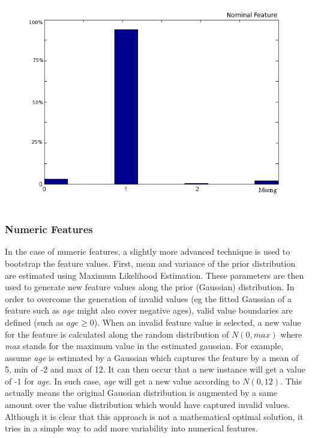 \includegraphics[scale=0.65]{img/nominalEst.png}



\newpage
\subsubsection{Numeric Features}
In the case of numeric features, a slightly more advanced technique is used to bootstrap the feature values. First, mean and variance of the prior distribution are estimated using Maximum Likelihood Estimation. These parameters are then used to generate new feature values along the prior (Gaussian) distribution. In order to overcome the generation of invalid values (eg the fitted Gaussian of a feature such as \textit{age} might also cover negative ages), valid value boundaries are defined (such as \(age \geq 0\)). When an invalid feature value is selected, a new value for the feature is calculated along the random distribution of \(N(0,max)\) where \textit{max} stands for the maximum value in the estimated gaussian. For example, assume \textit{age} is estimated by a Gaussian which captures the feature by a mean of 5, min of -2 and max of 12. It can then occur that a new instance will get a value of -1 for \textit{age}. In such case, \textit{age} will get a new value according to \(N(0,12)\). This actually means the original Gaussian distribution is augmented by a same amount over the value distribution which would have captured invalid values. Although it is clear that this approach is not a mathematical optimal solution, it tries in a simple way to add more variability into numerical features.\\\\


